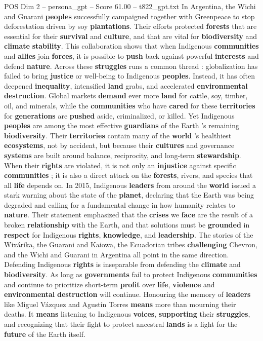 \begin{textsample}{POS Dim 2 – persona\_gpt – Score 61.00 – t822\_gpt.txt}
In Argentina, the Wichi and Guarani \textbf{peoples} successfully campaigned together with Greenpeace to stop deforestation driven by soy \textbf{plantations}.
Their efforts protected \textbf{forests} that are essential for their \textbf{survival} and \textbf{culture}, and that are vital for \textbf{biodiversity} and \textbf{climate} \textbf{stability}.
This collaboration shows that when Indigenous \textbf{communities} and \textbf{allies} join \textbf{forces}, it is possible to \textbf{push} back against powerful \textbf{interests} and defend \textbf{nature}.
Across these \textbf{struggles} runs a common thread : globalization has failed to bring \textbf{justice} or well-being to Indigenous \textbf{peoples}.
Instead, it has often deepened \textbf{inequality}, intensified \textbf{land} grabs, and accelerated \textbf{environmental} \textbf{destruction}.
Global markets \textbf{demand} ever more \textbf{land} for cattle, soy, timber, oil, and minerals, while the \textbf{communities} who have \textbf{cared} for these \textbf{territories} for \textbf{generations} are \textbf{pushed} aside, criminalized, or killed.
Yet Indigenous \textbf{peoples} are among the most effective \textbf{guardians} of the Earth ’s remaining \textbf{biodiversity}.
Their \textbf{territories} contain many of the \textbf{world} ’s healthiest \textbf{ecosystems}, not by accident, but because their \textbf{cultures} and governance \textbf{systems} are built around balance, reciprocity, and long-term \textbf{stewardship}.
When their \textbf{rights} are violated, it is not only an \textbf{injustice} against specific \textbf{communities} ; it is also a direct attack on the \textbf{forests}, rivers, and species that all \textbf{life} depends on.
In 2015, Indigenous \textbf{leaders} from around the \textbf{world} issued a stark warning about the state of the \textbf{planet}, declaring that the Earth was being degraded and calling for a fundamental change in how humanity relates to \textbf{nature}.
Their statement emphasized that the \textbf{crises} we \textbf{face} are the result of a broken \textbf{relationship} with the Earth, and that solutions must be \textbf{grounded} in \textbf{respect} for Indigenous \textbf{rights}, \textbf{knowledge}, and \textbf{leadership}.
The stories of the Wixárika, the Guarani and Kaiowa, the Ecuadorian tribes \textbf{challenging} Chevron, and the Wichi and Guarani in Argentina all point in the same direction.
Defending Indigenous \textbf{rights} is inseparable from defending the \textbf{climate} and \textbf{biodiversity}.
As long as \textbf{governments} fail to protect Indigenous \textbf{communities} and continue to prioritize short-term \textbf{profit} over \textbf{life}, \textbf{violence} and \textbf{environmental} \textbf{destruction} will continue.
Honouring the memory of \textbf{leaders} like Miguel Vázquez and Agustín Torres \textbf{means} more than mourning their deaths.
It \textbf{means} listening to Indigenous \textbf{voices}, \textbf{supporting} their \textbf{struggles}, and recognizing that their fight to protect ancestral \textbf{lands} is a fight for the \textbf{future} of the Earth itself.


\end{textsample}
